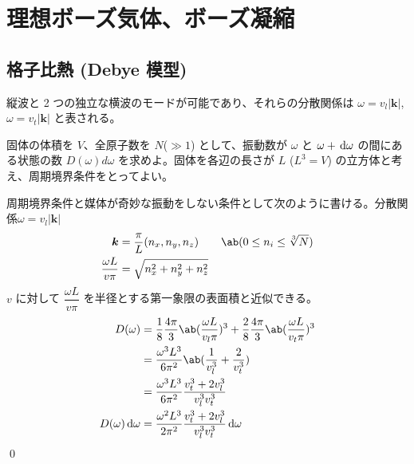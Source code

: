 \documentclass[uplatex,dvipdfmx,a4paper,11pt]{jlreq}
\makeatletter
\newcommand{\kk}{\bm{k}}
\numberwithin{equation}{section}
\theoremstyle{definition}
\renewenvironment{proof}[1][\proofname]{\par
  \normalfont
  \topsep6\p@\@plus6\p@ \trivlist
  \item[\hskip\labelsep{\bfseries #1}\@addpunct{\bfseries}]\ignorespaces\quad\par
}{%
  \qed\endtrivlist\@endpefalse
}
\renewcommand\proofname{証明}
\makeatother
\begin{document}
\section{理想ボーズ気体、ボーズ凝縮}
\subsection{格子比熱 (Debye 模型)}
縦波と 2 つの独立な横波のモードが可能であり、それらの分散関係は $\omega = v_l|\kk|$, $\omega = v_t|\kk|$ と表される。
\begin{problem}
固体の体積を $V$、全原子数を $N$($\gg 1$) として、振動数が $\omega$ と $\omega + \dl{\omega}$ の間にある状態の数 $D(ω)dω$ を求めよ。固体を各辺の長さが $L$ ($L^3 = V$) の立方体と考え、周期境界条件をとってよい。
\end{problem}
\begin{proof}
  周期境界条件と媒体が奇妙な振動をしない条件として次のように書ける。分散関係$\omega = v_l|\kk|$
  \begin{align}
    \kk                   & = \frac{\pi}{L}(n_x, n_y, n_z) \qquad \ab(0 \leq n_i \leq \sqrt[3]{N}) \\
    \frac{\omega L}{v\pi} & = \sqrt{n_x^2 + n_y^2 + n_z^2}
  \end{align}
  $v$ に対して $\dfrac{\omega L}{v\pi}$ を半径とする第一象限の表面積と近似できる。
  \begin{align}
    D(\omega)            & = \frac{1}{8}\frac{4\pi}{3}\ab(\frac{\omega L}{v_l\pi})^3 + \frac{2}{8}\frac{4\pi}{3}\ab(\frac{\omega L}{v_t\pi})^3 \\
                         & = \frac{\omega^3 L^3}{6\pi^2}\ab(\frac{1}{v_l^3} + \frac{2}{v_t^3})                                                 \\
                         & = \frac{\omega^3 L^3}{6\pi^2}\frac{v_t^3 + 2v_l^3}{v_l^3v_t^3}                                                      \\
    D(\omega)\dl{\omega} & = \frac{\omega^2 L^3}{2\pi^2}\frac{v_t^3 + 2v_l^3}{v_l^3v_t^3}\dl{\omega}                                           \\
  \end{align}
\end{proof}
\end{document}

